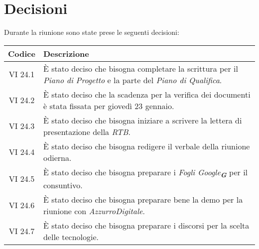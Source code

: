 
\section{Decisioni}

Durante la riunione sono state prese le seguenti decisioni:

\vspace{0.5cm}

\begin{table}[htbp]
    \centering
    \begin{tabular}{|c|p{}|}
        \hline
        \rowcolor[HTML]{C0C0C0}
        \textbf{Codice} & \textbf{Descrizione} \\
        \hline
        VI 24.1 & È stato deciso che bisogna completare la scrittura per il \emph{Piano di Progetto} e la parte del \emph{Piano di Qualifica}. \\
        \hline
        VI 24.2 & È stato deciso che la scadenza per la verifica dei documenti è stata fissata per giovedì 23 gennaio. \\
        \hline
        VI 24.3 & È stato deciso che bisogna iniziare a scrivere la lettera di presentazione della \emph{RTB}. \\
        \hline
        VI 24.4 & È stato deciso che bisogna redigere il verbale della riunione odierna. \\
        \hline
        VI 24.5 & È stato deciso che bisogna preparare i \emph{Fogli Google}\textsubscript{\textit{\textbf{G}}} per il consuntivo. \\
        \hline
        VI 24.6 & È stato deciso che bisogna preparare bene la demo per la riunione con \emph{AzzurroDigitale}. \\
        \hline
        VI 24.7 & È stato deciso che bisogna preparare i discorsi per la scelta delle tecnologie. \\
        \hline
    \end{tabular}
\end{table}
